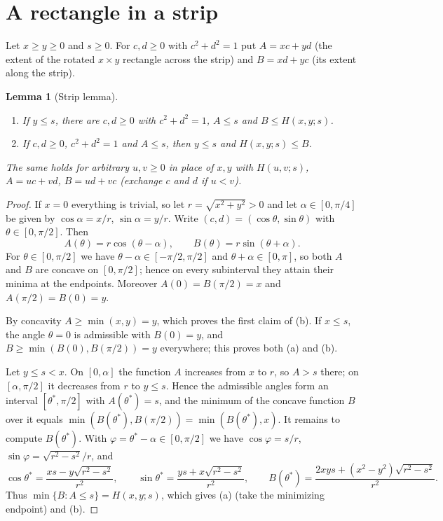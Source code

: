\documentclass[11pt]{article}
\newtheorem{lemma}[theorem]{Lemma}
\theoremstyle{definition}
\theoremstyle{remark}
\begin{document}
\section{A rectangle in a strip}\label{sec:strip}

Let $x\ge y\ge 0$ and $s\ge0$. For $c,d\ge0$ with $c^2+d^2=1$ put $A=xc+yd$ (the extent of the
rotated $x\times y$ rectangle across the strip) and $B=xd+yc$ (its extent along the strip).

\begin{lemma}[Strip lemma]\label{lem:strip}
\begin{enumerate}
\item[(a)] If $y\le s$, there are $c,d\ge 0$ with $c^2+d^2=1$, $A\le s$ and $B\le H(x,y;s)$.
\item[(b)] If $c,d\ge0$, $c^2+d^2=1$ and $A\le s$, then $y\le s$ and $H(x,y;s)\le B$.
\end{enumerate}
The same holds for arbitrary $u,v\ge0$ in place of $x,y$ with $H(u,v;s)$, $A=uc+vd$, $B=ud+vc$
(exchange $c$ and $d$ if $u<v$).
\end{lemma}

\begin{proof}
If $x=0$ everything is trivial, so let $r=\sqrt{x^2+y^2}>0$ and let $\alpha\in[0,\pi/4]$ be given by
$\cos\alpha=x/r$, $\sin\alpha=y/r$. Write $(c,d)=(\cos\theta,\sin\theta)$ with
$\theta\in[0,\pi/2]$. Then
\[
A(\theta)=r\cos(\theta-\alpha),\qquad B(\theta)=r\sin(\theta+\alpha).
\]
For $\theta\in[0,\pi/2]$ we have $\theta-\alpha\in[-\pi/2,\pi/2]$ and $\theta+\alpha\in[0,\pi]$, so
both $A$ and $B$ are concave on $[0,\pi/2]$; hence on every subinterval they attain their minima at
the endpoints. Moreover $A(0)=B(\pi/2)=x$ and $A(\pi/2)=B(0)=y$.

By concavity $A\ge\min(x,y)=y$, which proves the first claim of (b). If $x\le s$, the angle $\theta=0$
is admissible with $B(0)=y$, and $B\ge\min(B(0),B(\pi/2))=y$ everywhere; this proves both (a) and (b).

Let $y\le s<x$. On $[0,\alpha]$ the function $A$ increases from $x$ to $r$, so $A>s$ there; on
$[\alpha,\pi/2]$ it decreases from $r$ to $y\le s$. Hence the admissible angles form an interval
$[\theta^*,\pi/2]$ with $A(\theta^*)=s$, and the minimum of the concave function $B$ over it equals
$\min(B(\theta^*),B(\pi/2))=\min(B(\theta^*),x)$. It remains to compute $B(\theta^*)$. With
$\varphi=\theta^*-\alpha\in[0,\pi/2]$ we have $\cos\varphi=s/r$, $\sin\varphi=\sqrt{r^2-s^2}/r$, and
\[
\cos\theta^*=\frac{xs-y\sqrt{r^2-s^2}}{r^2},\qquad
\sin\theta^*=\frac{ys+x\sqrt{r^2-s^2}}{r^2},\qquad
B(\theta^*)=\frac{2xys+(x^2-y^2)\sqrt{r^2-s^2}}{r^2}.
\]
Thus $\min\{B:A\le s\}=H(x,y;s)$, which gives (a) (take the minimizing endpoint) and (b).
\end{proof}
\end{document}

